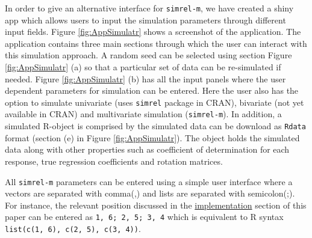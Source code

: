 \documentclass[3p,times,12pt,authoryear]{elsarticle}
\theoremstyle{definition}
\theoremstyle{definition}
\theoremstyle{remark}
\begin{document}
In order to give an alternative interface for \texttt{simrel-m}, we have
created a shiny app which allows users to input the simulation
parameters through different input fields. Figure \ref{fig:AppSimulatr}
shows a screenshot of the application. The application contains three
main sections through which the user can interact with this simulation
approach. A random seed can be selected using section Figure
\ref{fig:AppSimulatr} (a) so that a particular set of data can be
re-simulated if needed. Figure \ref{fig:AppSimulatr} (b) has all the
input panels where the user dependent parameters for simulation can be
entered. Here the user also has the option to simulate univariate (uses
\texttt{simrel} package in CRAN), bivariate (not yet available in CRAN)
and multivariate simulation (\texttt{simrel-m}). In addition, a
simulated R-object is comprised by the simulated data can be download as
\texttt{Rdata} format (section (e) in Figure \ref{fig:AppSimulatr}). The
object holds the simulated data along with other properties such as
coefficient of determination for each response, true regression
coefficients and rotation matrices.

All \texttt{simrel-m} parameters can be entered using a simple user
interface where a vectors are separated with comma(,) and lists are
separated with semicolon(;). For instance, the relevant position
discussed in the \protect\hyperlink{implementation}{implementation}
section of this paper can be entered as \texttt{1,\ 6;\ 2,\ 5;\ 3,\ 4}
which is equivalent to R syntax
\texttt{list(c(1,\ 6),\ c(2,\ 5),\ c(3,\ 4))}.
\end{document}
